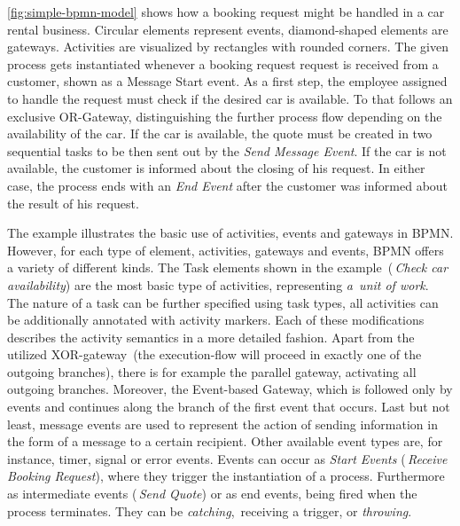 \autoref{fig:simple-bpmn-model} shows how a booking request might be handled in a car rental business.
Circular elements represent events, diamond-shaped elements are gateways. Activities are visualized by rectangles with rounded corners.
The given process gets instantiated whenever a booking request request is received from a customer, shown as a Message Start event. 
As a first step, the employee assigned to handle the request must check if the desired car is available. To that follows an exclusive OR-Gateway, distinguishing the further process flow depending on the availability of the car.
If the car is available, the quote must be created in two sequential tasks to be then sent out by the \textit{Send Message Event}. If the car is not available, the customer is informed about the closing of his request. 
In either case, the process ends with an \textit{End Event} after the customer was informed about the result of his request.

The example illustrates the basic use of activities, events and gateways in BPMN. However, for each type of element, activities, gateways and events, BPMN offers a variety of different kinds.
The Task elements shown in the example~(\eg \,\textit{Check car availability}) are the most basic type of activities, representing \textit{a~unit of work}. The nature of a task can be further specified using task types, all activities can be additionally annotated with activity markers. Each of these modifications describes the activity semantics in a more detailed fashion.
Apart from the utilized XOR-gateway~(the execution-flow will proceed in exactly one of the outgoing branches), there is for example the parallel gateway, activating all outgoing branches. Moreover, the Event-based Gateway, which is followed only by events and continues along the branch of the first event that occurs.
Last but not least, message events are used to represent the action of sending information in the form of a message to a certain recipient. Other available event types are, for instance, timer, signal or error events. Events can occur as \textit{Start Events} (\eg \,\textit{Receive Booking Request}), where they trigger the instantiation of a process. Furthermore as intermediate events (\eg \,\textit{Send Quote}) or as end events, being fired when the process terminates. They can be \textit{catching}, \ie \,receiving a trigger, or \textit{throwing}.

